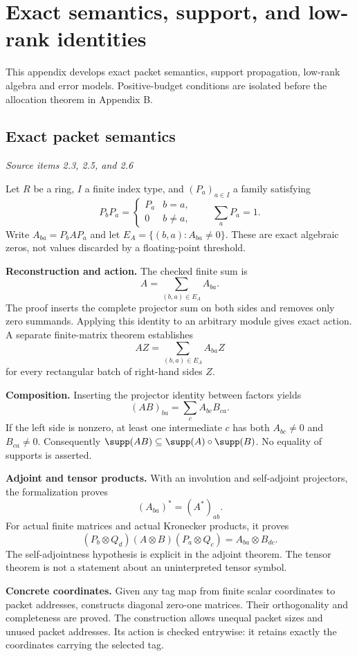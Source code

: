 \clearpage\FloatBarrier\section{Exact semantics, support, and low-rank identities}\label{supp1:section:001}
This appendix develops exact packet semantics, support propagation, low-rank algebra and error models. Positive-budget conditions are isolated before the allocation theorem in Appendix B.\par

\subsection{Exact packet semantics}\label{supp1:subsection:001}\textit{Source items 2.3, 2.5, and 2.6}\par
Let $R$ be a ring, $I$ a finite index type, and $(P_a)_{a\in I}$ a family satisfying
\[
P_bP_a=\begin{cases}P_a&b=a,\\0&b\ne a,\end{cases}
\qquad \sum_aP_a=1.
\]
Write $A_{ba}=P_bAP_a$ and let $E_A=\{(b,a):A_{ba}\ne0\}$. These are exact algebraic zeros, not values discarded by a floating-point threshold.

\textbf{Reconstruction and action.} The checked finite sum is
\[
\boxed{A=\sum_{(b,a)\in E_A} A_{ba}.}
\]
The proof inserts the complete projector sum on both sides and removes only zero summands. Applying this identity to an arbitrary module gives exact action. A separate finite-matrix theorem establishes
\[
AZ=\sum_{(b,a)\in E_A}A_{ba}Z
\]
for every rectangular batch of right-hand sides $Z$.

\textbf{Composition.} Inserting the projector identity between factors yields
\[
\boxed{(AB)_{ba}=\sum_c A_{bc}B_{ca}.}
\]
If the left side is nonzero, at least one intermediate $c$ has both $A_{bc}\ne0$ and $B_{ca}\ne0$. Consequently $\supp(AB)\subseteq\supp(A)\circ\supp(B)$. No equality of supports is asserted.

\textbf{Adjoint and tensor products.} With an involution and self-adjoint projectors, the formalization proves
\[
(A_{ba})^*=(A^*)_{ab}.
\]
For actual finite matrices and actual Kronecker products, it proves
\[
(P_b\otimes Q_d)(A\otimes B)(P_a\otimes Q_c)
=A_{ba}\otimes B_{dc}.
\]
The self-adjointness hypothesis is explicit in the adjoint theorem. The tensor theorem is not a statement about an uninterpreted tensor symbol.

\textbf{Concrete coordinates.} Given any tag map from finite scalar coordinates to packet addresses,  constructs diagonal zero-one matrices. Their orthogonality and completeness are proved. The construction allows unequal packet sizes and unused packet addresses. Its action is checked entrywise: it retains exactly the coordinates carrying the selected tag.

